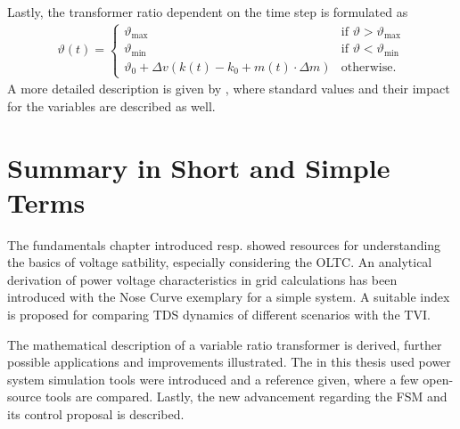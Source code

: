 Lastly, the transformer ratio dependent on the time step is formulated as 
\begin{align}
    \vartheta(t) = \begin{cases}
        \vartheta_\mathrm{max} & \text{if }\vartheta > \vartheta_\mathrm{max} \\
        \vartheta_\mathrm{min} & \text{if }\vartheta < \vartheta_\mathrm{min} \\
        \vartheta_0 + \Delta v (k(t)-k_0+m(t) \cdot \Delta m) & \text{otherwise.}
    \end{cases}\label{eq:fsm-control-transformer-ratio}
\end{align}
A more detailed description is given by \textcite{burlakin_2024}, where standard values and their impact for the variables are described as well.

\section{Summary in Short and Simple Terms}

The fundamentals chapter introduced resp. showed resources for understanding the basics of voltage satbility, especially considering the \acs{OLTC}.
An analytical derivation of power voltage characteristics in grid calculations has been introduced with the Nose Curve exemplary for a simple system.
A suitable index is proposed for comparing \ac{TDS} dynamics of different scenarios with the \acf{TVI}.

The mathematical description of a variable ratio transformer is derived, further possible applications and improvements illustrated.
The in this thesis used power system simulation tools were introduced and a reference given, where a few open-source tools are compared.
Lastly, the new advancement regarding the \acs{FSM} and its control proposal is described.